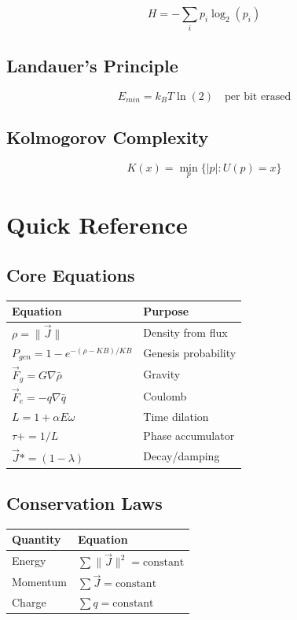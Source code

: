 \documentclass[
  11pt,
  letterpaper,
  twoside,
  openany]{book}
\makeatletter
\let\orig@section\section
\renewcommand{\section}{\needspace{8\baselineskip}\orig@section}
\let\orig@subsection\subsection
\renewcommand{\subsection}{\needspace{6\baselineskip}\orig@subsection}
\makeatother
\begin{document}
\[
H = -\sum_i p_i \log_2(p_i)
\]

\subsection{Landauer's Principle}\label{landauers-principle}

\[
E_{min} = k_B T \ln(2) \quad \text{per bit erased}
\]

\subsection{Kolmogorov Complexity}\label{kolmogorov-complexity}

\[
K(x) = \min_p\{|p| : U(p) = x\}
\]

\section{Quick Reference}\label{quick-reference}

\subsection{Core Equations}\label{core-equations}

\begin{longtable}[]{@{}ll@{}}
\toprule\noalign{}
Equation & Purpose \\
\midrule\noalign{}
\endhead
\bottomrule\noalign{}
\endlastfoot
\(\rho = \|\vec{J}\|\) & Density from flux \\
\(P_{gen} = 1 - e^{-(\rho-KB)/KB}\) & Genesis probability \\
\(\vec{F}_g = G \nabla\bar{\rho}\) & Gravity \\
\(\vec{F}_e = -q \nabla\bar{q}\) & Coulomb \\
\(L = 1 + \alpha E \omega\) & Time dilation \\
\(\tau += 1/L\) & Phase accumulator \\
\(\vec{J} *= (1-\lambda)\) & Decay/damping \\
\end{longtable}

\subsection{Conservation Laws}\label{conservation-laws}

\begin{longtable}[]{@{}ll@{}}
\toprule\noalign{}
Quantity & Equation \\
\midrule\noalign{}
\endhead
\bottomrule\noalign{}
\endlastfoot
Energy & \(\sum \|\vec{J}\|^2 = \text{constant}\) \\
Momentum & \(\sum \vec{J} = \text{constant}\) \\
Charge & \(\sum q = \text{constant}\) \\
\end{longtable}
\end{document}
